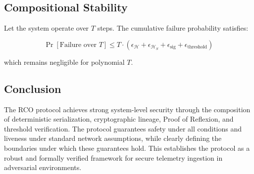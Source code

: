 \subsection{Compositional Stability}

Let the system operate over $T$ steps. The cumulative failure probability satisfies:

\begin{equation}
\Pr[\text{Failure over } T] \leq T \cdot (\epsilon_{\mathcal{H}} + \epsilon_{\mathcal{H}_S} + \epsilon_{\text{sig}} + \epsilon_{\text{threshold}})
\end{equation}

which remains negligible for polynomial $T$.

\subsection{Conclusion}

The RCO protocol achieves strong system-level security through the composition of deterministic serialization, cryptographic lineage, Proof of Reflexion, and threshold verification. The protocol guarantees safety under all conditions and liveness under standard network assumptions, while clearly defining the boundaries under which these guarantees hold. This establishes the protocol as a robust and formally verified framework for secure telemetry ingestion in adversarial environments.